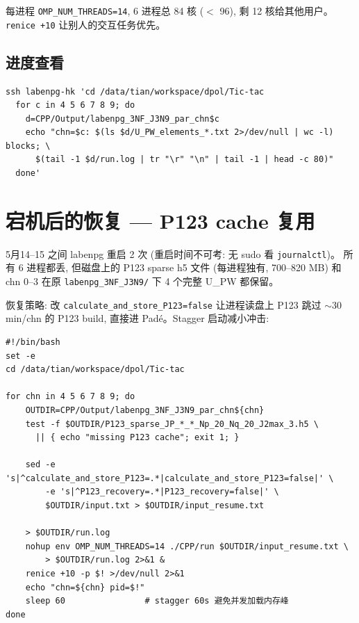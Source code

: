 \documentclass[11pt,a4paper]{article}
\begin{document}
每进程 \texttt{OMP\_NUM\_THREADS=14}, 6 进程总 84 核 ($<$ 96), 剩 12 核给其他用户。
\texttt{renice +10} 让别人的交互任务优先。

\subsection{进度查看}

\begin{lstlisting}
ssh labenpg-hk 'cd /data/tian/workspace/dpol/Tic-tac
  for c in 4 5 6 7 8 9; do
    d=CPP/Output/labenpg_3NF_J3N9_par_chn$c
    echo "chn=$c: $(ls $d/U_PW_elements_*.txt 2>/dev/null | wc -l) blocks; \
      $(tail -1 $d/run.log | tr "\r" "\n" | tail -1 | head -c 80)"
  done'
\end{lstlisting}

\section{宕机后的恢复 — P123 cache 复用}

5月14--15 之间 labenpg 重启 2 次 (重启时间不可考: 无 sudo 看 \texttt{journalctl})。
所有 6 进程都丢, 但磁盘上的 P123 sparse h5 文件 (每进程独有, 700--820 MB)
和 chn 0--3 在原 \texttt{labenpg\_3NF\_J3N9/} 下 4 个完整 U\_PW 都保留。

恢复策略: 改 \texttt{calculate\_and\_store\_P123=false} 让进程读盘上 P123 跳过
$\sim$30 min/chn 的 P123 build, 直接进 Padé。Stagger 启动减小冲击:

\begin{lstlisting}[caption={relaunch\_3nf\_parallel.sh — 利用 P123 cache 续跑}]
#!/bin/bash
set -e
cd /data/tian/workspace/dpol/Tic-tac

for chn in 4 5 6 7 8 9; do
    OUTDIR=CPP/Output/labenpg_3NF_J3N9_par_chn${chn}
    test -f $OUTDIR/P123_sparse_JP_*_*_Np_20_Nq_20_J2max_3.h5 \
      || { echo "missing P123 cache"; exit 1; }

    sed -e 's|^calculate_and_store_P123=.*|calculate_and_store_P123=false|' \
        -e 's|^P123_recovery=.*|P123_recovery=false|' \
        $OUTDIR/input.txt > $OUTDIR/input_resume.txt

    > $OUTDIR/run.log
    nohup env OMP_NUM_THREADS=14 ./CPP/run $OUTDIR/input_resume.txt \
        > $OUTDIR/run.log 2>&1 &
    renice +10 -p $! >/dev/null 2>&1
    echo "chn=${chn} pid=$!"
    sleep 60                # stagger 60s 避免并发加载内存峰
done
\end{lstlisting}
\end{document}
